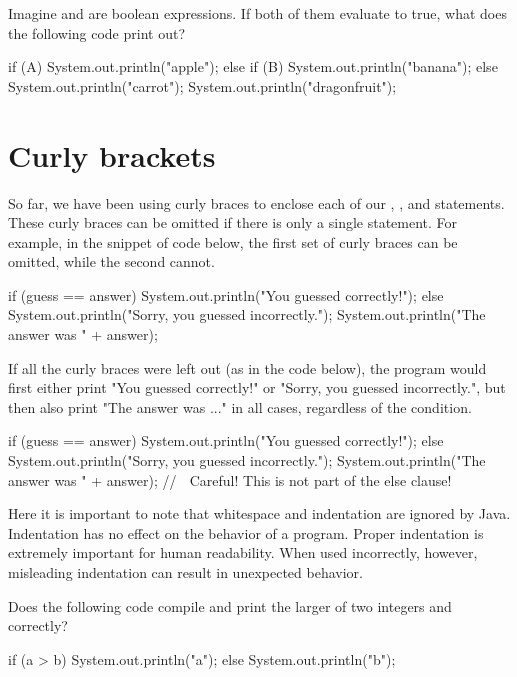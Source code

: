 \begin{example}
Imagine  and  are boolean expressions. If both of them evaluate to true, what does the following code print out?

\begin{code}
if (A) {
    System.out.println("apple");
} else if (B) {
    System.out.println("banana");
} else {
    System.out.println("carrot");
} 
System.out.println("dragonfruit");
\end{code}
\end{example}

\section{Curly brackets}
So far, we have been using curly braces to enclose each of our , , and  statements. These curly braces can be omitted if there is only a single statement. For example, in the snippet of code below, the first set of curly braces can be omitted, while the second cannot.

\begin{code}
if (guess == answer) {
    System.out.println("You guessed correctly!");
} else {
    System.out.println("Sorry, you guessed incorrectly.");
    System.out.println("The answer was " + answer);
} 
\end{code}

If all the curly braces were left out (as in the code below), the program would first either print "You guessed correctly!" or "Sorry, you guessed incorrectly.", but then also print "The answer was ..." in all cases, regardless of the condition.

\begin{code}
if (guess == answer)
    System.out.println("You guessed correctly!");
else
    System.out.println("Sorry, you guessed incorrectly.");
    System.out.println("The answer was " + answer); 
    // ^^^ Careful! This is not part of the else clause!
\end{code}

Here it is important to note that whitespace and indentation are ignored by Java. Indentation has no effect on the behavior of a program. Proper indentation is extremely important for human readability. When used incorrectly, however, misleading indentation can result in unexpected behavior.

\begin{example}
Does the following code compile and print the larger of two integers  and  correctly?

\begin{code}
if (a > b)      System.out.println("a");
else {
System.out.println("b");
}
\end{code}
\end{example}

